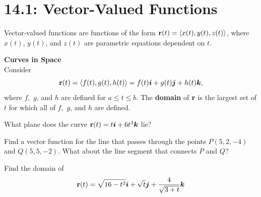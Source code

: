 \documentclass[mathNotesPreamble]{subfiles}
\begin{document}
\section{14.1: Vector-Valued Functions}

  Vector-valued functions are functions of the form ${\mathbf{r}}(t)={\left\langle x(t),y(t),z(t) \right\rangle}$, where $x(t)$, $y(t)$, and $z(t)$ are parametric equations dependent on $t$.
  
  \begin{center}
  \end{center}
  
  \textbf{Curves in Space}\\
  Consider 
    \[{\mathbf{r}}(t)={\left\langle f(t),g(t),h(t) \right\rangle}=f(t){\bm{i}}+g(t){\bm{j}}+h(t){\bm{k}},\]
  where $f$,\ $g$, and $h$ are defined for $a\leq t\leq b$. The
  \textbf{domain} of ${\mathbf{r}}$ is the largest set of $t$ for which all of
  $f$,\ $g$, and $h$ are defined.
  \vspace*{\baselineskip}

  \begin{ex*}
    What plane does the curve ${\mathbf{r}}(t)=t{\bm{i}}+6t^3{\bm{k}}$ lie?
  \end{ex*}

  \begin{ex*}
    Find a vector function for the line that passes through the points $P(5,2,-4)$ and $Q(5,5,-2)$. What about the line segment that connects $P$ and $Q$?
  \end{ex*}
  \pagebreak

  \begin{ex*}
    Find the domain of
      \[{\mathbf{r}}(t)=\sqrt{16-t^2}{\bm{i}}+\sqrt{t}{\bm{j}}+\frac{4}{\sqrt{3+t}}{\bm{k}}\]
  \end{ex*}
\end{document}
